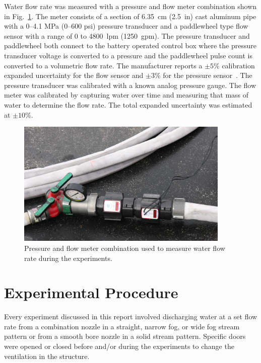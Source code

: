 \documentclass[12pt,oneside]{book}
\begin{document}
Water flow rate was measured with a pressure and flow meter combination shown in Fig.~\ref{fig:flow_meter}. The meter consists of a section of 6.35~cm (2.5~in) cast aluminum pipe with a 0--4.1 MPa (0--600 psi) pressure transducer and a paddlewheel type flow sensor with a range of 0 to 4800~lpm (1250~gpm). The pressure transducer and paddlewheel both connect to the battery operated control box where the pressure transducer voltage is converted to a pressure and the paddlewheel pulse count is converted to a volumetric flow rate. The manufacturer reports a $\pm5$\% calibration expanded uncertainty for the flow sensor and $\pm3$\%  for the pressure sensor~\cite{Akron}. The pressure transducer was calibrated with a known analog pressure gauge. The flow meter was calibrated by capturing water over time and measuring that mass of water to determine the flow rate. The total expanded uncertainty was estimated at $\pm10$\%. 
\begin{figure}[!ht]
	\includegraphics[width=4in]{../Figures/Pictures/flow_meter}
	\caption[Flow meter used to measure flow rate during experiments.]{Pressure and flow meter combination used to measure water flow rate during the experiments.}
	\label{fig:flow_meter}
\end{figure}
\FloatBarrier

\section{Experimental Procedure}
\label{sec:exp_procedure}
Every experiment discussed in this report involved discharging water at a set flow rate from a combination nozzle in a straight, narrow fog, or wide fog stream pattern or from a smooth bore nozzle in a solid stream pattern. Specific doors were opened or closed before and/or during the experiments to change the ventilation in the structure. 
\end{document}
